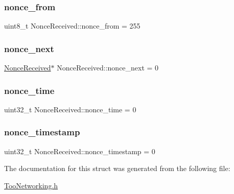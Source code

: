 \subsubsection{\texorpdfstring{nonce\+\_\+from}{nonce\_from}}
{\footnotesize\ttfamily uint8\+\_\+t Nonce\+Received\+::nonce\+\_\+from = 255}

\mbox{\label{structNonceReceived_abfc581a902d83cac731aa843feeea5e2}} 
\subsubsection{\texorpdfstring{nonce\+\_\+next}{nonce\_next}}
{\footnotesize\ttfamily \hyperlink{structNonceReceived}{Nonce\+Received}$\ast$ Nonce\+Received\+::nonce\+\_\+next = 0}

\mbox{\label{structNonceReceived_adce029bb8f1d7bb73522ed06efca86c0}} 
\subsubsection{\texorpdfstring{nonce\+\_\+time}{nonce\_time}}
{\footnotesize\ttfamily uint32\+\_\+t Nonce\+Received\+::nonce\+\_\+time = 0}

\mbox{\label{structNonceReceived_a39c9b5816fb33fe66f80c8bf98eca7d5}} 
\subsubsection{\texorpdfstring{nonce\+\_\+timestamp}{nonce\_timestamp}}
{\footnotesize\ttfamily uint32\+\_\+t Nonce\+Received\+::nonce\+\_\+timestamp = 0}



The documentation for this struct was generated from the following file\+:\begin{DoxyCompactItemize}
\item 
\hyperlink{TooNetworking_8h}{Too\+Networking.\+h}\end{DoxyCompactItemize}
